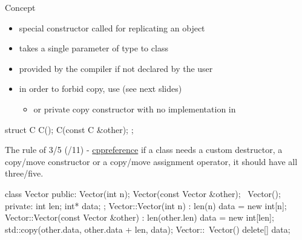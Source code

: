 \begin{frame}[fragile]
  \begin{block}{Concept}
    \begin{itemize}
    \item special constructor called for replicating an object
    \item takes a single parameter of type  to class
    \item provided by the compiler if not declared by the user
    \item in order to forbid copy, use  (see next slides)
      \begin{itemize}
      \item or private copy constructor with no implementation in 
      \end{itemize}
    \end{itemize}
  \end{block}
  \pause
  \begin{cppcode}
    struct C {
      C();
      C(const C &other);
    };
  \end{cppcode}
  \pause
  \begin{goodpractice}[Rule of 3/5]{The rule of 3/5 (/11) - \href{https://en.cppreference.com/w/cpp/language/rule_of_three}{cppreference}}
    if a class needs a custom destructor, a copy/move constructor or a copy/move assignment operator, it should have all three/five.
  \end{goodpractice}
\end{frame}

\begin{frame}[fragile]
  \begin{cppcode}
    class Vector {
    public:
      Vector(int n);
      Vector(const Vector &other);
      ~Vector();
    private:
      int len; int* data;
    };
    Vector::Vector(int n) : len(n) {
      data = new int[n];
    }
    Vector::Vector(const Vector &other) : len(other.len) {
      data = new int[len];
      std::copy(other.data, other.data + len, data);
    }
    Vector::~Vector() { delete[] data; }
  \end{cppcode}
\end{frame}

